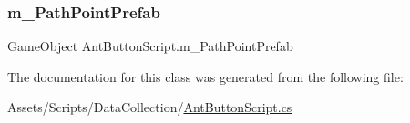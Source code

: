 \mbox{\label{class_ant_button_script_a74cf7ea28e9aef6e698f3eecf79b56bc}} 
\subsubsection{\texorpdfstring{m\_PathPointPrefab}{m\_PathPointPrefab}}
{\footnotesize\ttfamily Game\+Object Ant\+Button\+Script.\+m\+\_\+\+Path\+Point\+Prefab}



The documentation for this class was generated from the following file\+:\begin{DoxyCompactItemize}
\item 
Assets/\+Scripts/\+Data\+Collection/\mbox{\hyperlink{_ant_button_script_8cs}{Ant\+Button\+Script.\+cs}}\end{DoxyCompactItemize}
